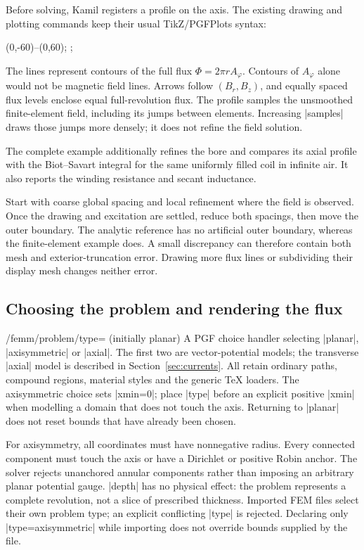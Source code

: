 Before solving, Kamil registers a profile on the axis. The existing drawing
and plotting commands keep their usual TikZ/PGFPlots syntax:
\begin{codeexample}
\path[femm/profile={name=solenoid-axis,samples=121}]
  (0,-60)--(0,60);
;
\femmplot[profile=solenoid-axis,component=Bz,abscissa=z]
\end{codeexample}
The lines represent contours of the full flux $\Phi=2\pi rA_\varphi$.
Contours of $A_\varphi$ alone would not be magnetic field lines. Arrows follow
$(B_r,B_z)$, and equally spaced flux levels enclose equal full-revolution flux.
The profile samples the unsmoothed finite-element field, including its jumps
between elements. Increasing |samples| draws those jumps more densely; it does
not refine the field solution.

The complete example additionally refines the bore and compares its axial
profile with the Biot--Savart integral for the same uniformly filled coil in
infinite air. It also reports the winding resistance and secant inductance.

Start with coarse global spacing and local refinement where the field is
observed. Once the drawing and excitation are settled, reduce both spacings,
then move the outer boundary. The analytic reference has no artificial outer
boundary, whereas the finite-element example does. A small discrepancy can
therefore contain both mesh and exterior-truncation error. Drawing more flux
lines or subdividing their display mesh changes neither error.

\subsection{Choosing the problem and rendering the flux}
\begin{key}{/femm/problem/type= (initially planar)}
A PGF choice handler selecting |planar|, |axisymmetric| or |axial|.
The first two are vector-potential models; the transverse |axial| model is
described in Section~\ref{sec:currents}. All retain ordinary paths, compound
regions, material styles and the generic TeX loaders.
The axisymmetric choice sets |xmin=0|; place |type| before an explicit positive
|xmin| when modelling a domain that does not touch the axis. Returning to
|planar| does not reset bounds that have already been chosen.

For axisymmetry, all coordinates must have nonnegative radius. Every connected
component must touch the axis or have a Dirichlet or positive Robin anchor.
The solver rejects unanchored annular components rather than imposing
an arbitrary planar potential gauge. |depth| has no physical effect: the
problem represents a complete revolution, not a slice of prescribed thickness.
Imported FEM files select their own problem type; an explicit conflicting
|type| is rejected. Declaring only |type=axisymmetric| while importing does not
override bounds supplied by the file.
\end{key}

